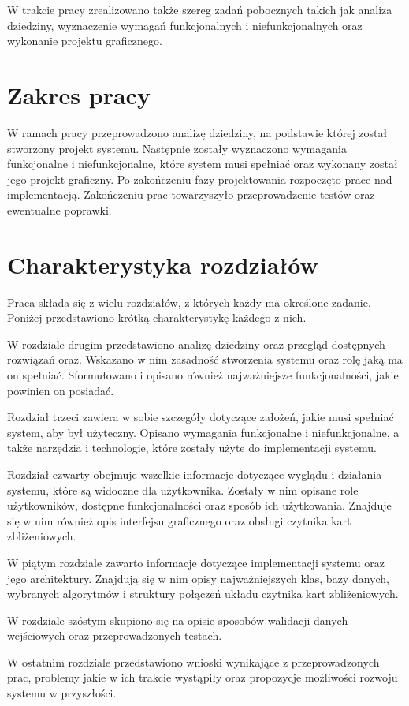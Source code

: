 W trakcie pracy zrealizowano także szereg zadań pobocznych takich jak analiza dziedziny, wyznaczenie wymagań funkcjonalnych i niefunkcjonalnych oraz wykonanie projektu graficznego.

\section{Zakres pracy}

W ramach pracy przeprowadzono analizę dziedziny, na podstawie której został stworzony projekt systemu. Następnie zostały wyznaczono wymagania funkcjonalne i niefunkcjonalne, które system musi spełniać oraz wykonany został jego projekt graficzny. Po zakończeniu fazy projektowania rozpoczęto prace nad implementacją. Zakończeniu prac towarzyszyło przeprowadzenie testów oraz ewentualne poprawki.

\section{Charakterystyka rozdziałów}

Praca składa się z wielu rozdziałów, z których każdy ma określone zadanie. Poniżej przedstawiono krótką charakterystykę każdego z nich.

W rozdziale drugim przedstawiono analizę dziedziny oraz przegląd dostępnych rozwiązań oraz. Wskazano w nim zasadność stworzenia systemu oraz rolę jaką ma on spełniać. Sformułowano i opisano również najważniejsze funkcjonalności, jakie powinien on posiadać.

Rozdział trzeci zawiera w sobie szczegóły dotyczące założeń, jakie musi spełniać system, aby był użyteczny. Opisano wymagania funkcjonalne i niefunkcjonalne, a także narzędzia i technologie, które zostały użyte do implementacji systemu.

Rozdział czwarty obejmuje wszelkie informacje dotyczące wyglądu i działania systemu, które są widoczne dla użytkownika. Zostały w nim opisane role użytkowników, dostępne funkcjonalności oraz sposób ich użytkowania. Znajduje się w nim również opis interfejsu graficznego oraz obsługi czytnika kart zbliżeniowych.

W piątym rozdziale zawarto informacje dotyczące implementacji systemu oraz jego architektury. Znajdują się w nim opisy najważniejszych klas, bazy danych, wybranych algorytmów i struktury połączeń układu czytnika kart zbliżeniowych.

W rozdziale szóstym skupiono się na opisie sposobów walidacji danych wejściowych oraz przeprowadzonych testach.

W ostatnim rozdziale przedstawiono wnioski wynikające z przeprowadzonych prac, problemy jakie w ich trakcie wystąpiły oraz propozycje możliwości rozwoju systemu w przyszłości.



